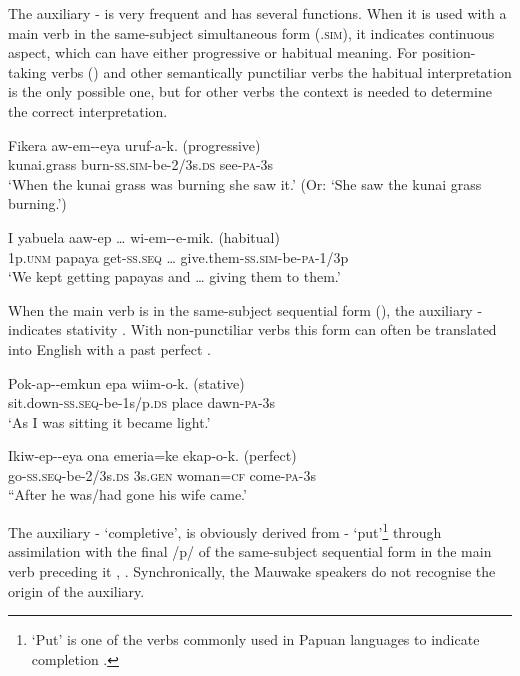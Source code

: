 The auxiliary - is very frequent and has several functions. When it is used with a main verb in the same-subject simultaneous form (.\textsc{sim}), it indicates continuous aspect, which can have either progressive  or habitual  meaning. For position-taking verbs () and other semantically punctiliar verbs the habitual interpretation is the only possible one, but for other verbs the context is needed to determine the correct interpretation. 

\ea%
\label{ex:3:x339}
\gll Fikera aw-em--eya uruf-a-k. (progressive) \\
kunai.grass burn-\textsc{ss}.\textsc{sim}-be-2/3s.\textsc{ds} see-\textsc{pa}-3s \\
\glt`When the kunai grass was burning she saw it.' (Or: `She saw the kunai grass burning.')
\z

\ea%
\label{ex:3:x340}
\gll I yabuela aaw-ep {\dots} wi-em--e-mik. (habitual) \\
1p.\textsc{unm} papaya get-\textsc{ss}.\textsc{seq} {\dots} give.them-\textsc{ss}.\textsc{sim}-be-\textsc{pa}-1/3p \\
\glt`We kept getting papayas and {\dots} giving them to them.'
\z

When the main verb is in the same-subject sequential form (), the auxiliary - indicates stativity . With non-punctiliar verbs this form can often be translated into English with a past perfect .

\ea%
\label{ex:3:x341}
\gll Pok-ap--emkun epa wiim-o-k. (stative) \\
sit.down-\textsc{ss}.\textsc{seq}-be-1s/p.\textsc{ds} place dawn-\textsc{pa}-3s \\
\glt`As I was sitting it became light.'
\z

\ea%
\label{ex:3:x342}
\gll Ikiw-ep--eya ona emeria=ke ekap-o-k. (perfect) \\
go-\textsc{ss}.\textsc{seq}-be-2/3s.\textsc{ds} 3s.\textsc{gen} woman=\textsc{cf} come-\textsc{pa}-3s \\
\glt``After he was/had gone his wife came.'
\z

The auxiliary - `completive', is obviously derived from - `put'\footnote{`Put' is one of the verbs commonly used in Papuan languages to indicate completion \citep[145]{Foley1986}.} through assimilation with the final /p/ of the same-subject sequential form in the main verb preceding it ,  . Synchronically, the Mauwake speakers do not recognise the origin of the auxiliary.

